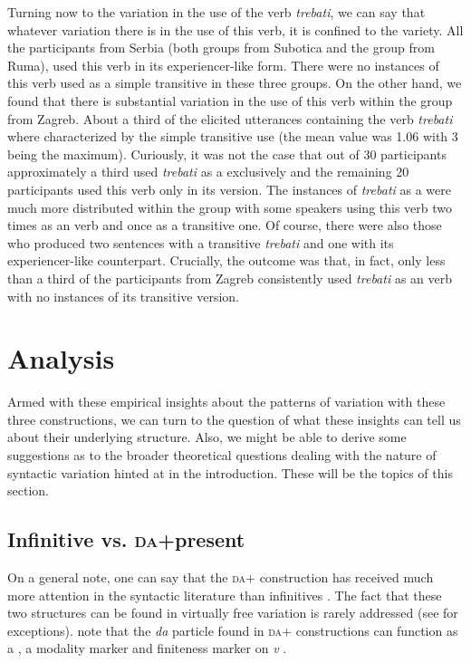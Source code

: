 \documentclass[output=paper,modfonts,newtxmath,hidelinks,]{langscibook}
\begin{document}
\largerpage%
Turning now to the variation in the use of the verb \textit{trebati}, we can say that whatever variation there is in the use of this verb, it is confined to the  variety. All the participants from Serbia (both groups from Subotica and the group from Ruma), used this verb in its experiencer-like form. There were no instances of this verb used as a simple transitive in these three groups. On the other hand, we found that there is substantial variation in the use of this verb within the group from Zagreb. About a third of the elicited utterances containing the verb \textit{trebati} where characterized by the simple transitive use (the mean value was 1.06 with 3 being the maximum). Curiously, it was not the case that out of 30 participants approximately a third used \textit{trebati} as a  exclusively and the remaining 20 participants used this verb only in its  version. The instances of \textit{trebati} as a  were much more distributed within the group with some speakers using this verb two times as an  verb and once as a transitive one. Of course, there were also those who produced two sentences with a transitive \textit{trebati} and one with its experiencer-like counterpart. Crucially, the outcome was that, in fact, only less than a third of the participants from Zagreb consistently used \textit{trebati} as an  verb with no instances of its transitive version.

\section{Analysis}\label{7:s4}


\largerpage%
Armed with these empirical insights about the patterns of variation with these three constructions, we can turn to the question of what these insights can tell us about their underlying structure. Also, we might be able to derive some suggestions as to the broader theoretical questions dealing with the nature of syntactic variation hinted at in the introduction. These will be the topics of this section.

\subsection{Infinitive vs. \textsc{da}+present}\label{7:s4.1}

On a general note, one can say that the \textsc{da}+ construction has received much more attention in the syntactic literature than infinitives \citep{Todorovic2012,Miseska-Tomic2004}. The fact that these two structures can be found in virtually free variation is rarely addressed (see \citealt{Belic2005} for exceptions). \citet{TodorovicWurmbrand2015} note that the \textit{da} particle found in \textsc{da}+ constructions can function as a  , a modality marker  and finiteness marker on \textit{v} .
\end{document}
